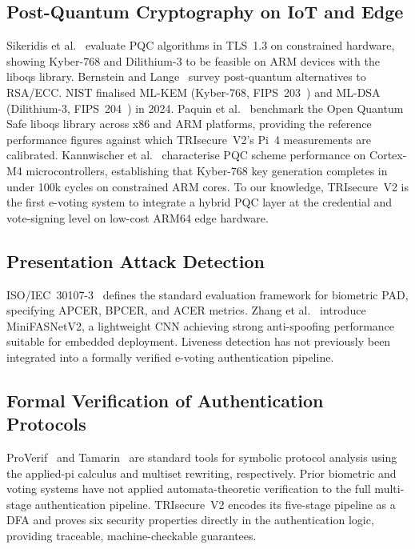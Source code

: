 \documentclass[pdflatex,sn-mathphys-num]{sn-jnl}%
\theoremstyle{thmstyleone}%
\theoremstyle{thmstyletwo}%
\theoremstyle{thmstylethree}%
\begin{document}
\subsection{Post-Quantum Cryptography on IoT and Edge}

Sikeridis et al.~\cite{sikeridis2020pqc} evaluate PQC algorithms in TLS~1.3 on
constrained hardware, showing Kyber-768 and Dilithium-3 to be feasible on ARM
devices with the liboqs library. Bernstein and Lange~\cite{bernstein2017post}
survey post-quantum alternatives to RSA/ECC. NIST finalised ML-KEM
(Kyber-768, FIPS~203~\cite{nist_fips203}) and ML-DSA (Dilithium-3,
FIPS~204~\cite{nist_fips204}) in 2024. Paquin et al.~\cite{paquin2019oqs}
benchmark the Open Quantum Safe liboqs library across x86 and ARM platforms,
providing the reference performance figures against which TRIsecure~V2's Pi~4
measurements are calibrated. Kannwischer et al.~\cite{kannwischer2019pqm4}
characterise PQC scheme performance on Cortex-M4 microcontrollers, establishing
that Kyber-768 key generation completes in under 100k cycles on constrained ARM
cores. To our knowledge, TRIsecure~V2 is the first e-voting system to integrate
a hybrid PQC layer at the credential and vote-signing level on low-cost ARM64
edge hardware.

\subsection{Presentation Attack Detection}

ISO/IEC~30107-3~\cite{iso30107} defines the standard evaluation framework for
biometric PAD, specifying APCER, BPCER, and ACER metrics. Zhang et
al.~\cite{zhang2020minifasnet} introduce MiniFASNetV2, a lightweight CNN
achieving strong anti-spoofing performance suitable for embedded deployment.
Liveness detection has not previously been integrated into a formally verified
e-voting authentication pipeline.

\subsection{Formal Verification of Authentication Protocols}

ProVerif~\cite{blanchet2016proverif} and Tamarin~\cite{meier2013tamarin} are
standard tools for symbolic protocol analysis using the applied-pi calculus and
multiset rewriting, respectively. Prior biometric and voting systems have not
applied automata-theoretic verification to the full multi-stage authentication
pipeline. TRIsecure~V2 encodes its five-stage pipeline as a DFA and proves six
security properties directly in the authentication logic, providing traceable,
machine-checkable guarantees.
\end{document}

